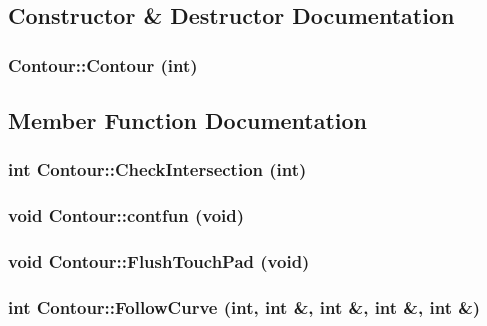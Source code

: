 \subsection{Constructor \& Destructor Documentation}
\hypertarget{classContour_a10}{
\subsubsection[Contour]{\setlength{\rightskip}{0pt plus 5cm}Contour::Contour (int)}}
\label{classContour_a10}




\subsection{Member Function Documentation}
\hypertarget{classContour_a4}{
\subsubsection[CheckIntersection]{\setlength{\rightskip}{0pt plus 5cm}int Contour::Check\-Intersection (int)}}
\label{classContour_a4}


\hypertarget{classContour_a2}{
\subsubsection[contfun]{\setlength{\rightskip}{0pt plus 5cm}void Contour::contfun (void)}}
\label{classContour_a2}


\hypertarget{classContour_a9}{
\subsubsection[FlushTouchPad]{\setlength{\rightskip}{0pt plus 5cm}void Contour::Flush\-Touch\-Pad (void)}}
\label{classContour_a9}


\hypertarget{classContour_a6}{
\subsubsection[FollowCurve]{\setlength{\rightskip}{0pt plus 5cm}int Contour::Follow\-Curve (int, int \&, int \&, int \&, int \&)}}
\label{classContour_a6}


